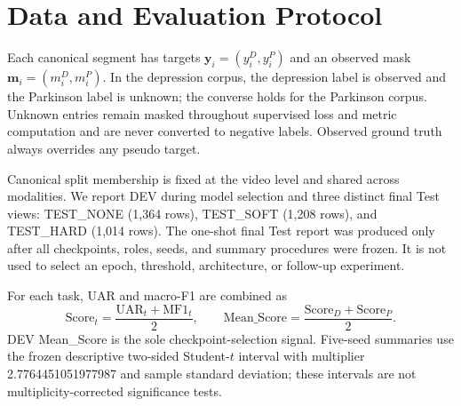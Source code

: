 \section{Data and Evaluation Protocol}
\label{sec:protocol}

Each canonical segment has targets $\mathbf{y}_i=(y_i^D,y_i^P)$ and an observed mask $\mathbf{m}_i=(m_i^D,m_i^P)$. In the depression corpus, the depression label is observed and the Parkinson label is unknown; the converse holds for the Parkinson corpus. Unknown entries remain masked throughout supervised loss and metric computation and are never converted to negative labels. Observed ground truth always overrides any pseudo target.

Canonical split membership is fixed at the video level and shared across modalities. We report DEV during model selection and three distinct final Test views: TEST\_NONE (1,364 rows), TEST\_SOFT (1,208 rows), and TEST\_HARD (1,014 rows). The one-shot final Test report was produced only after all checkpoints, roles, seeds, and summary procedures were frozen. It is not used to select an epoch, threshold, architecture, or follow-up experiment.

For each task, UAR and macro-F1 are combined as
\begin{equation}
 \mathrm{Score}_t = \frac{\mathrm{UAR}_t+\mathrm{MF1}_t}{2},
 \qquad \mathrm{Mean\_Score}=\frac{\mathrm{Score}_D+\mathrm{Score}_P}{2}.
\end{equation}
DEV Mean\_Score is the sole checkpoint-selection signal. Five-seed summaries use the frozen descriptive two-sided Student-$t$ interval with multiplier 2.7764451051977987 and sample standard deviation; these intervals are not multiplicity-corrected significance tests.
